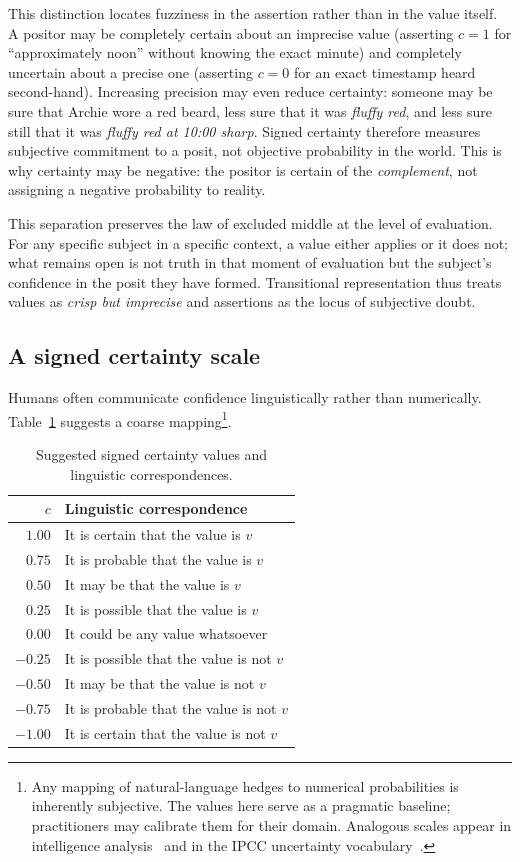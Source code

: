 \documentclass[a4paper,fleqn]{cas-sc}
\begin{document}
This distinction locates fuzziness in the assertion rather than in the value itself. A positor may be completely certain about an imprecise value (asserting \(c=1\) for ``approximately noon'' without knowing the exact minute) and completely uncertain about a precise one (asserting \(c=0\) for an exact timestamp heard second-hand). Increasing precision may even reduce certainty: someone may be sure that Archie wore a red beard, less sure that it was \emph{fluffy red}, and less sure still that it was \emph{fluffy red at 10{:}00 sharp}. Signed certainty therefore measures subjective commitment to a posit, not objective probability in the world. This is why certainty may be negative: the positor is certain of the \emph{complement}, not assigning a negative probability to reality.

This separation preserves the law of excluded middle at the level of evaluation. For any specific subject in a specific context, a value either applies or it does not; what remains open is not truth in that moment of evaluation but the subject's confidence in the posit they have formed. Transitional representation thus treats values as \emph{crisp but imprecise} and assertions as the locus of subjective doubt.

\subsection{A signed certainty scale}
Humans often communicate confidence linguistically rather than numerically. Table~\ref{Table:certainties2} suggests a coarse mapping\footnote{Any mapping of natural-language hedges to numerical probabilities is inherently subjective. The values here serve as a pragmatic baseline; practitioners may calibrate them for their domain. Analogous scales appear in intelligence analysis~\cite{ShermanKent1964} and in the IPCC uncertainty vocabulary~\cite{IPCC}.}. 

\begin{table}[htb]
\centering
\small
\begin{tabular}{r l}
\toprule
\(c\) & Linguistic correspondence \\ \midrule
$1.00$   & It is certain that the value is $v$ \\
$0.75$   & It is probable that the value is $v$ \\
$0.50$   & It may be that the value is $v$ \\
$0.25$   & It is possible that the value is $v$ \\
$0.00$   & It could be any value whatsoever \\
$-0.25$  & It is possible that the value is not $v$ \\
$-0.50$  & It may be that the value is not $v$ \\
$-0.75$  & It is probable that the value is not $v$ \\
$-1.00$  & It is certain that the value is not $v$ \\
\bottomrule
\end{tabular}
\caption{Suggested signed certainty values and linguistic correspondences.}
\label{Table:certainties2}
\end{table}
\end{document}
